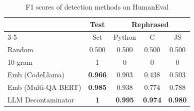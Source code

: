 \begin{table}[h]
\centering
\caption{F1 scores of detection methods on HumanEval}
\label{table:new_f1_scores}
\footnotesize
\begin{tabular}{l|c|c|c|c}
\toprule
& \multirow{2}{*}{Test } & \multicolumn{3}{c}{Rephrased} \\
\cmidrule(lr){3-5}
& Set & Python & C & JS \\
\midrule
Random & 0.500 & 0.500 & 0.500 & 0.500 \\
10-gram & 1 & 0 & 0 & 0 \\
Emb (CodeLlama) & \textbf{0.966} & 0.903 & 0.438 & 0.503 \\
Emb (Multi-QA BERT) & \textbf{0.985} & 0.938 & 0.774 & 0.788 \\
LLM Decontaminator & \textbf{1} & \textbf{0.995} & \textbf{0.974} & \textbf{0.980} \\
\bottomrule
\end{tabular}
\vspace{-20pt}
\end{table}







